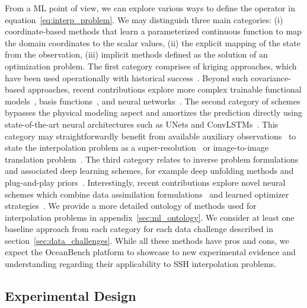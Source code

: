 From a ML point of view, we can explore various ways to define the operator in equation~\eqref{eq:interp_problem}. 
We may distinguish three main categories: (i) coordinate-based methods that learn a parameterized continuous function to map the domain coordinates to the scalar values, (ii) the explicit mapping of the state from the observation, (iii) implicit methods defined as the solution of an optimization problem. 
The first category comprises of kriging approaches, which have been used operationally with historical success~\cite{KRIGINGREVIEW,DUACS}. Beyond such covariance-based approaches, recent contributions explore more complex trainable functional models~\cite{GPsBIGDATA}, basis functions~\cite{MIOST}, and neural networks~\cite{NERFSSSH}. 
The second category of schemes bypasses the physical modeling aspect and amortizes the prediction directly using state-of-the-art neural architectures such as UNets and ConvLSTMs~\cite{SSHInterpAttention, SSHInterpConvLSTM, SSHInterpUNet}. 
This category may straightforwardly benefit from available auxiliary observations~\citep{CDSOBSSST,CDSOBSSSTENS,CDSOBSOC} 
to state the interpolation problem as a super-resolution~\cite{SuperResSurvey} or image-to-image translation problem~\cite{IMAGE2IMAGETRANSLATION, IMAGE2IMAGETRANSLATION2}. 
The third category relates to inverse problem formulations and associated deep learning schemes, for example deep unfolding methods and plug-and-play priors~\cite{DEEPUNFOLDING}. 
Interestingly, recent contributions explore novel neural schemes which combine data assimilation formulations~\cite{DAGEOSCIENCE} and learned optimizer strategies~\cite{4DVARNETSWOT,4DVARNETSST}.
We provide a more detailed ontology of methods used for interpolation problems in appendix~\ref{sec:ml_ontology}. 
We consider at least one baseline approach from each category for each data challenge described in section~\ref{sec:data_challenges}. 
While all these methods have pros and cons, we expect the OceanBench platform to showcase to new experimental evidence and understanding regarding their applicability to SSH interpolation problems.
 

\subsection*{Experimental Design} \label{sec:experimental_design}


